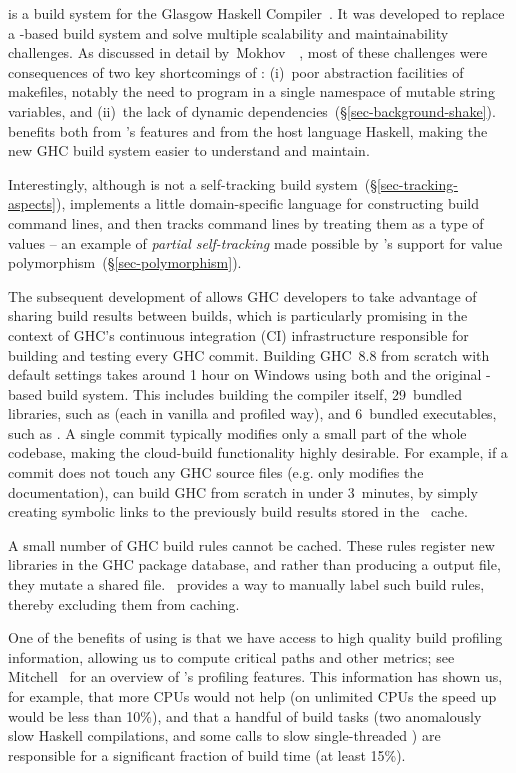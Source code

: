 \Hadrian is a build system for the Glasgow Haskell Compiler~\cite{ghc}. It was
developed to replace a \Make-based build system and solve multiple scalability
and maintainability challenges. As discussed in detail
by~Mokhov~\etal~, most of these challenges were consequences
of two key shortcomings of \Make: (i)~poor abstraction facilities of makefiles,
notably the need to program in a single namespace of mutable string variables, and
(ii)~the lack of dynamic dependencies~(\S\ref{sec-background-shake}).
\Hadrian benefits both from \Shake's features and from the host language
Haskell, making the new GHC build system easier to understand and maintain.

Interestingly, although \Shake is not a self-tracking build
system~(\S\ref{sec-tracking-aspects}), \Hadrian implements a little
domain-specific language for constructing build command lines, and then tracks
command lines by treating them as a type of values -- an example of
\emph{partial self-tracking} made possible by \Shake's support for value
polymorphism~(\S\ref{sec-polymorphism}).

The subsequent development of \Cloud \Shake allows GHC developers to take advantage of
sharing build results between builds, which is particularly promising in the
context of GHC's continuous integration (CI) infrastructure responsible for
building and testing every GHC commit. Building GHC~8.8 from scratch with
default settings takes around 1 hour on Windows using both \Hadrian and the
original \Make-based build system. This includes building the compiler itself,
29~bundled libraries, such as  (each in vanilla and profiled way), and
6~bundled executables, such as . A single commit typically modifies
only a small part of the whole codebase, making the cloud-build functionality
highly desirable. For example, if a commit does not touch any GHC source files
(e.g. only modifies the documentation), \Hadrian can build GHC from scratch in under
3~minutes, by simply creating symbolic links to the previously build results
stored in the \Cloud~\Shake cache.

A small number of GHC build rules cannot be cached. These rules register new libraries
in the GHC package database, and rather than producing a output file, they mutate
a shared file. \Cloud~\Shake provides a way to manually label such
build rules, thereby excluding them from caching.

One of the benefits of using \Shake is that we have access to high quality build
profiling information, allowing us to compute critical paths and other metrics;
see Mitchell~ for an overview of \Shake's
profiling features. This information has shown us, for example, that more CPUs would not help (on
unlimited CPUs the speed up would be less than 10\%), and that a handful of
build tasks (two anomalously slow Haskell compilations, and some calls to slow
single-threaded ) are responsible for a significant fraction of
build time (at least 15\%).

